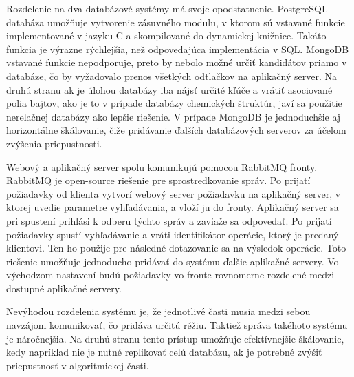 \documentclass[slovak]{ExcelAtFIT} %
\begin{document}
Rozdelenie na dva databázové systémy má svoje opodstatnenie. PostgreSQL databáza umožňuje vytvorenie zásuvného modulu, v ktorom sú vstavané funkcie implementované v jazyku C a skompilované do dynamickej knižnice. Takáto funkcia je výrazne rýchlejšia, než odpovedajúca implementácia v SQL. MongoDB vstavané funkcie nepodporuje, preto by nebolo možné určiť kandidátov priamo v databáze, čo by vyžadovalo prenos všetkých odtlačkov na aplikačný server. Na druhú stranu ak je úlohou databázy iba nájsť určité kľúče a vrátiť asociované polia bajtov, ako je to v prípade databázy chemických štruktúr, javí sa použitie nerelačnej databázy ako lepšie riešenie. V prípade MongoDB je jednoduchšie aj horizontálne škálovanie, čiže pridávanie ďalších databázových serverov za účelom zvýšenia priepustnosti.

Webový a aplikačný server spolu komunikujú pomocou RabbitMQ fronty. RabbitMQ je open-source riešenie pre sprostredkovanie správ. Po prijatí po\-žia\-dav\-ky od klienta vytvorí webový server požiadavku na aplikačný server, v ktorej uvedie parametre vy\-hľa\-dá\-va\-nia, a vloží ju do fronty. Aplikačný server sa pri spustení prihlási k odberu týchto správ a zaviaže sa odpovedať. Po prijatí požiadavky spustí vyhľadávanie a vráti identifikátor operácie, ktorý je predaný klientovi. Ten ho použije pre následné dotazovanie sa na výsledok operácie. Toto riešenie umožňuje jednoducho pridávať do systému ďalšie aplikačné servery. Vo východzom nastavení budú požiadavky vo fronte rovnomerne rozdelené medzi dostupné aplikačné servery.

Nevýhodou rozdelenia systému je, že jednotlivé časti musia medzi sebou navzájom komunikovať, čo pridáva určitú réžiu. Taktiež správa takéhoto systému je náročnejšia. Na druhú stranu tento prístup umožňuje efektívnejšie škálovanie, kedy napríklad nie je nutné replikovať celú databázu, ak je potrebné zvýšiť priepustnosť v algoritmickej časti.  
\end{document}
